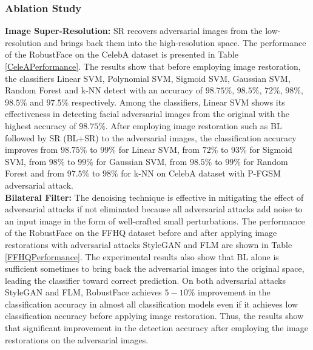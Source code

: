 \documentclass[sn-mathphys]{sn-jnl}%
\theoremstyle{thmstyleone}%
\theoremstyle{thmstyletwo}%
\theoremstyle{thmstylethree}%
\begin{document}
\subsubsection{Ablation Study}
\textbf{Image Super-Resolution:} SR recovers adversarial images from the low-resolution and brings back them into the high-resolution space. The performance of the RobustFace on the CelebA dataset is presented in Table \ref{CeleAPerformance}. The results show that before employing image restoration, the classifiers Linear SVM, Polynomial SVM, Sigmoid SVM, Gaussian SVM, Random Forest and k-NN detect with an accuracy of $98.75\%$, $98.5\%$, $72\%$, $98\%$, $98.5\%$ and $97.5\%$ respectively. Among the classifiers, Linear SVM shows its effectiveness in detecting facial adversarial images from the original with the highest accuracy of $98.75\%$. After employing image restoration such as BL followed by SR (BL+SR) to the adversarial images, the classification accuracy improves from $98.75\%$ to $99\%$ for Linear SVM, from $72\%$ to $93\%$ for Sigmoid SVM, from $98\%$ to $99\%$ for Gaussian SVM, from $98.5\%$ to $99\%$ for Random Forest and from $97.5\%$ to $98\%$ for k-NN on CelebA dataset with P-FGSM adversarial attack.\\
\textbf{Bilateral Filter:} The denoising technique is effective in mitigating the effect of adversarial attacks if not eliminated because all adversarial attacks add noise to an
input image in the form of well-crafted small perturbations. The performance of the RobustFace on the FFHQ dataset before and after applying image restorations with adversarial attacks StyleGAN and FLM are shown in Table \ref{FFHQPerformance}. The experimental results also show that BL alone is sufficient sometimes to bring back the adversarial images into the original space, leading the classifier toward correct prediction. On both adversarial attacks StyleGAN and FLM, RobustFace achieves $5-10\%$ improvement in the classification accuracy in almost all classification models even if it achieves low classification accuracy before applying image restoration. Thus, the results show that significant improvement in the detection accuracy after employing the image restorations on the adversarial images. 
\end{document}
